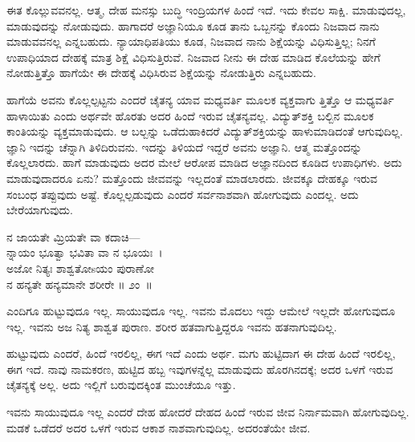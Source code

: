 ಈತ ಕೊಲ್ಲುವವನಲ್ಲ. ಆತ್ಮ, ದೇಹ ಮನಸ್ಸು ಬುದ್ಧಿ ಇಂದ್ರಿಯಗಳ ಹಿಂದೆ ಇದೆ. ಇದು ಕೇವಲ ಸಾಕ್ಷಿ. ಮಾಡುವುದಲ್ಲ, ಮಾಡುವುದನ್ನು ನೋಡುವುದು. ಹಾಗಾದರೆ ಅಜ್ಞಾನಿಯೂ ಕೂಡ ತಾನು ಒಬ್ಬನನ್ನು ಕೊಂದು ನಿಜವಾದ ನಾನು ಮಾಡುವವನಲ್ಲ ಎನ್ನಬಹುದು. ನ್ಯಾಯಾಧಿ\-ಪತಿಯು ಕೂಡ, ನಿಜವಾದ ನಾನು ಶಿಕ್ಷೆಯನ್ನು ವಿಧಿಸುತ್ತಿಲ್ಲ; ನಿನಗೆ ಉಪಾಧಿಯಾದ ದೇಹಕ್ಕೆ ಮಾತ್ರ ಶಿಕ್ಷೆ ವಿಧಿಸುತ್ತಿರುವೆ. ನಿಜವಾದ ನೀನು ಈ ದೇಹ ಮಾಡಿದ ಕೊಲೆಯನ್ನು ಹೇಗೆ ನೋಡುತ್ತಿತ್ತೊ ಹಾಗೆಯೇ ಈ ದೇಹಕ್ಕೆ ವಿಧಿಸಿರುವ ಶಿಕ್ಷೆಯನ್ನು ನೋಡುತ್ತಿರು ಎನ್ನಬಹುದು.

ಹಾಗೆಯೆ ಅವನು ಕೊಲ್ಲಲ್ಪಟ್ಟನು ಎಂದರೆ ಚೈತನ್ಯ ಯಾವ ಮಧ್ಯವರ್ತಿ ಮೂಲಕ ವ್ಯಕ್ತವಾಗು ತ್ತಿತ್ತೊ ಆ ಮಧ್ಯವರ್ತಿ ಹಾಳಾಯಿತು ಎಂದು ಅರ್ಥವೇ ಹೊರತು ಅದರ ಹಿಂದೆ ಇರುವ ಚೈತನ್ಯವಲ್ಲ. ವಿದ್ಯುತ್​ಶಕ್ತಿ ಬಲ್ಬಿನ ಮೂಲಕ ಕಾಂತಿಯನ್ನು ವ್ಯಕ್ತಮಾಡುವುದು. ಆ ಬಲ್ಬನ್ನು ಒಡೆದುಹಾಕಿದರೆ ವಿದ್ಯುತ್​ಶಕ್ತಿಯನ್ನು ಹಾಳುಮಾಡಿದಂತೆ ಆಗುವುದಿಲ್ಲ. ಜ್ಞಾನಿ ಇದನ್ನು ಚೆನ್ನಾಗಿ ತಿಳಿದಿರುವನು. ಇದನ್ನು ತಿಳಿಯದೆ ಇದ್ದರೆ ಅವನು ಅಜ್ಞಾನಿ. ಆತ್ಮ ಮತ್ತೊಂದನ್ನು ಕೊಲ್ಲಲಾರದು. ಹಾಗೆ ಮಾಡುವುದು ಅದರ ಮೇಲೆ ಆರೋಪ ಮಾಡಿದ ಅಜ್ಞಾನದಿಂದ ಕೂಡಿದ ಉಪಾಧಿಗಳು. ಅದು ಮಾಡುವುದಾದರೂ ಏನು? ಮತ್ತೊಂದು ಜೀವವನ್ನು ಇಲ್ಲದಂತೆ ಮಾಡಲಾರದು. ಜೀವಕ್ಕೂ ದೇಹಕ್ಕೂ ಇರುವ ಸಂಬಂಧ ತಪ್ಪುವುದು ಅಷ್ಟೆ. ಕೊಲ್ಲಲ್ಪಡುವುದು ಎಂದರೆ ಸರ್ವನಾಶವಾಗಿ ಹೋಗುವುದು ಎಂದಲ್ಲ. ಅದು ಬೇರೆಯಾಗುವುದು.

\begin{shloka}
ನ ಜಾಯತೇ ಮ್ರಿಯತೇ ವಾ ಕದಾಚಿ—\\ನ್ನಾಯಂ ಭೂತ್ವಾ ಭವಿತಾ ವಾ ನ ಭೂಯಃ~।\\ಅಜೋ ನಿತ್ಯಃ ಶಾಶ್ವತೋsಯಂ ಪುರಾಣೋ\\ನ ಹನ್ಯತೇ ಹನ್ಯಮಾನೇ ಶರೀರೇ \hfill॥ ೨ಂ~॥
\end{shloka}

\begin{artha}
 ಎಂದಿಗೂ ಹುಟ್ಟುವುದೂ ಇಲ್ಲ. ಸಾಯುವುದೂ ಇಲ್ಲ. ಇವನು ಮೊದಲು ಇದ್ದು ಆಮೇಲೆ ಇಲ್ಲದೇ ಹೋಗುವುದೂ ಇಲ್ಲ. ಇವನು ಅಜ ನಿತ್ಯ ಶಾಶ್ವತ ಪುರಾಣ. ಶರೀರ ಹತವಾಗುತ್ತಿದ್ದರೂ ಇವನು ಹತನಾಗುವುದಿಲ್ಲ.
\end{artha}

ಹುಟ್ಟುವುದು ಎಂದರೆ, ಹಿಂದೆ ಇರಲಿಲ್ಲ, ಈಗ ಇದೆ ಎಂದು ಅರ್ಥ. ಮಗು ಹುಟ್ಟಿದಾಗ ಈ ದೇಹ ಹಿಂದೆ ಇರಲಿಲ್ಲ, ಈಗ ಇದೆ. ನಾವು ನಾಮಕರಣ, ಹುಟ್ಟಿದ ಹಬ್ಬ ಇವುಗಳನ್ನೆಲ್ಲ ಮಾಡುವುದು ಹೊರಗಿನದಕ್ಕೆ; ಅದರ ಒಳಗೆ ಇರುವ ಚೈತನ್ಯಕ್ಕೆ ಅಲ್ಲ. ಅದು ಇಲ್ಲಿಗೆ ಬರುವುದಕ್ಕಿಂತ ಮುಂಚೆಯೂ ಇತ್ತು.

\newpage

ಇವನು ಸಾಯುವುದೂ ಇಲ್ಲ ಎಂದರೆ ದೇಹ ಹೋದರೆ ದೇಹದ ಹಿಂದೆ ಇರುವ ಜೀವ ನಿರ್ನಾಮವಾಗಿ ಹೋಗುವುದಿಲ್ಲ. ಮಡಕೆ ಒಡೆದರೆ ಅದರ ಒಳಗೆ ಇರುವ ಆಕಾಶ ನಾಶವಾಗುವುದಿಲ್ಲ. ಅದರಂತೆಯೇ ಜೀವ.

